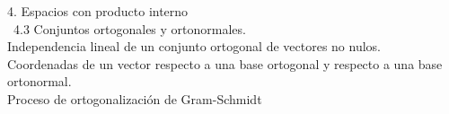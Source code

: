 \documentclass[preview]{standalone}
\begin{document}
\begin{center}
4. Espacios con producto interno \\\ 4.3 Conjuntos ortogonales y ortonormales. \\  Independencia lineal de un conjunto ortogonal de vectores no nulos. \\ Coordenadas de un vector respecto a una base ortogonal y respecto a una base ortonormal. \\ Proceso de ortogonalización de Gram-Schmidt
\end{center}
\end{document}
